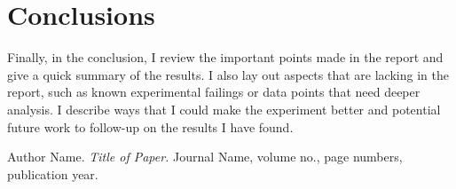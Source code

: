 \documentclass[11pt]{article}
\begin{document}
\section{Conclusions}

Finally, in the conclusion, I review the important points made in the report 
and give a quick summary of the results. I also lay out aspects that are 
lacking in the report, such as known experimental failings or data points that 
need deeper analysis. I describe ways that I could make the experiment better 
and potential future work to follow-up on the results I have found.

\begin{thebibliography}{0}
  Author Name. \emph{Title of Paper.} Journal Name, volume no., page numbers, 
  publication year.
\end{thebibliography}
\end{document}
